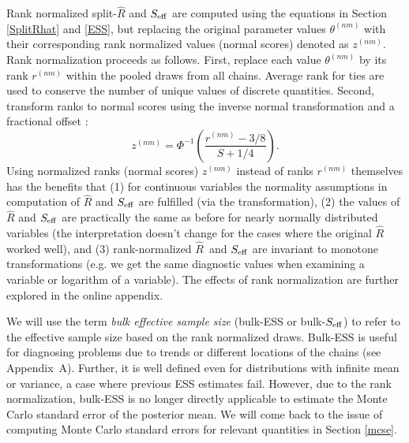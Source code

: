 \documentclass[american,]{article}
\newcommand{\Rhat}{$\widehat{R}$}
\theoremstyle{definition}
\begin{document}
Rank normalized split-\(\widehat{R}\) and \(S_{\rm eff}\) are
computed using the equations in Section \ref{SplitRhat} and \ref{ESS}, but
replacing the original parameter values \(\theta^{(nm)}\) with their
corresponding rank normalized values (normal scores) denoted as \(z^{(nm)}\). Rank
normalization proceeds as follows.  First, replace each value
\(\theta^{(nm)}\) by its rank \(r^{(nm)}\) within the pooled draws
from all chains.  Average rank for ties are used to conserve the
number of unique values of discrete quantities.  Second, transform
ranks to normal scores using the inverse normal transformation and
a fractional offset \citep{Blom:1958}:
\begin{equation}
z^{(nm)} = \Phi^{-1}\left(\frac{r^{(nm)}-3/8}{S+1/4}\right).
\end{equation}
Using normalized ranks (normal scores)
\(z^{(nm)}\) instead of ranks \(r^{(nm)}\) themselves has the
benefits that (1) for continuous variables the normality assumptions in computation of \(\widehat{R}\) and \(S_{\rm eff}\) are fulfilled (via the transformation), (2) the values of \(\widehat{R}\) and \(S_{\rm eff}\) are practically the
same as before for nearly normally distributed variables (the interpretation doesn't change for the cases where the original \(\widehat{R}\) worked well), and (3) rank-normalized 
\Rhat\ and \(S_{\rm eff}\) are invariant to monotone transformations (e.g. we get the same diagnostic values when examining a variable or logarithm of a variable).
The effects of rank normalization are further explored in the online appendix.

We will use the term \emph{bulk effective sample size} (bulk-ESS or
bulk-\(S_{\rm eff}\)) to refer to the effective sample size based on the
rank normalized draws. Bulk-ESS is useful for diagnosing problems due to
trends or different locations of the chains (see Appendix~A). Further, it is
well defined even for distributions with infinite mean or variance, a
case where previous ESS estimates fail. However, due to the rank
normalization, bulk-ESS is no longer directly applicable to estimate the
Monte Carlo standard error of the posterior mean. We will come back to
the issue of computing Monte Carlo standard errors for relevant
quantities in Section \ref{mcse}.
\end{document}

